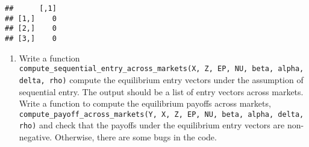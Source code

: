 \documentclass[
]{article}
\providecommand{\tightlist}{%
  \setlength{\itemsep}{0pt}\setlength{\parskip}{0pt}}
\begin{document}
\begin{verbatim}
##      [,1]
## [1,]    0
## [2,]    0
## [3,]    0
\end{verbatim}

\begin{enumerate}
\def\labelenumi{\arabic{enumi}.}
\setcounter{enumi}{6}
\tightlist
\item
  Write a function
  \texttt{compute\_sequential\_entry\_across\_markets(X,\ Z,\ EP,\ NU,\ beta,\ alpha,\ delta,\ rho)}
  compute the equilibrium entry vectors under the assumption of
  sequential entry. The output should be a list of entry vectors across
  markets. Write a function to compute the equilibrium payoffs across
  markets,
  \texttt{compute\_payoff\_across\_markets(Y,\ X,\ Z,\ EP,\ NU,\ beta,\ alpha,\ delta,\ rho)}
  and check that the payoffs under the equilibrium entry vectors are
  non-negative. Otherwise, there are some bugs in the code.
\end{enumerate}
\end{document}

